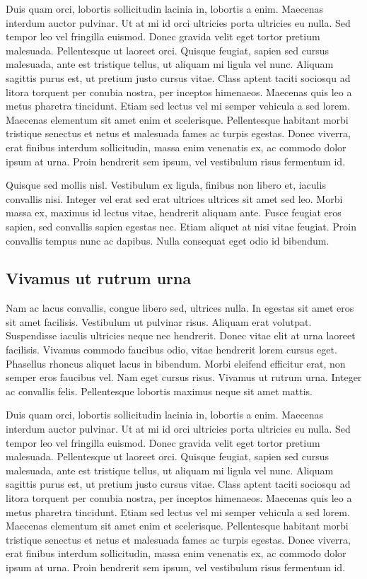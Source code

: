 \documentclass[twocolumn,a4paper,10pt]{article}
\begin{document}
Duis quam orci, lobortis sollicitudin lacinia in, lobortis a enim. Maecenas interdum auctor pulvinar.
Ut at mi id orci ultricies porta ultricies eu nulla. Sed tempor leo vel fringilla euismod. Donec gravida velit
eget tortor pretium malesuada. Pellentesque ut laoreet orci. Quisque feugiat, sapien sed cursus malesuada,
ante est tristique tellus, ut aliquam mi ligula vel nunc. Aliquam sagittis purus est, ut pretium justo cursus vitae.
Class aptent taciti sociosqu ad litora torquent per conubia nostra, per inceptos himenaeos.
Maecenas quis leo a metus pharetra tincidunt. Etiam sed lectus vel mi semper vehicula a sed lorem.
Maecenas elementum sit amet enim et scelerisque.
Pellentesque habitant morbi tristique senectus et netus et malesuada fames ac turpis egestas.
Donec viverra, erat finibus interdum sollicitudin, massa enim venenatis ex, ac commodo dolor ipsum at urna.
Proin hendrerit sem ipsum, vel vestibulum risus fermentum id.

Quisque sed mollis nisl. Vestibulum ex ligula, finibus non libero et, iaculis convallis nisi.
Integer vel erat sed erat ultrices ultrices sit amet sed leo. Morbi massa ex, maximus id lectus vitae,
hendrerit aliquam ante. Fusce feugiat eros sapien, sed convallis sapien egestas nec. Etiam aliquet at
nisi vitae feugiat. Proin convallis tempus nunc ac dapibus. Nulla consequat eget odio id bibendum.

\subsection{Vivamus ut rutrum urna}

Nam ac lacus convallis, congue libero sed, ultrices nulla. In egestas sit amet eros sit amet facilisis.
Vestibulum ut pulvinar risus. Aliquam erat volutpat. Suspendisse iaculis ultricies neque nec hendrerit.
Donec vitae elit at urna laoreet facilisis. Vivamus commodo faucibus odio, vitae hendrerit lorem cursus eget.
Phasellus rhoncus aliquet lacus in bibendum. Morbi eleifend efficitur erat, non semper eros faucibus vel.
Nam eget cursus risus. Vivamus ut rutrum urna. Integer ac convallis felis.
Pellentesque lobortis maximus neque sit amet mattis.

Duis quam orci, lobortis sollicitudin lacinia in, lobortis a enim. Maecenas interdum auctor pulvinar.
Ut at mi id orci ultricies porta ultricies eu nulla. Sed tempor leo vel fringilla euismod. Donec gravida velit
eget tortor pretium malesuada. Pellentesque ut laoreet orci. Quisque feugiat, sapien sed cursus malesuada,
ante est tristique tellus, ut aliquam mi ligula vel nunc. Aliquam sagittis purus est, ut pretium justo cursus vitae.
Class aptent taciti sociosqu ad litora torquent per conubia nostra, per inceptos himenaeos.
Maecenas quis leo a metus pharetra tincidunt. Etiam sed lectus vel mi semper vehicula a sed lorem.
Maecenas elementum sit amet enim et scelerisque.
Pellentesque habitant morbi tristique senectus et netus et malesuada fames ac turpis egestas.
Donec viverra, erat finibus interdum sollicitudin, massa enim venenatis ex, ac commodo dolor ipsum at urna.
Proin hendrerit sem ipsum, vel vestibulum risus fermentum id.
\end{document}
